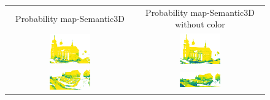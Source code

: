     \begin{figure}[h!]
        \centering
        \begin{tabular}{cc}
            Probability map-Semantic3D & Probability map-Semantic3D without color \\
            \includegraphics[width=0.33\textwidth, height=0.18\textheight]{images/ood_imgs/de_sem3d/de_prob_10_1.pdf}&
            \includegraphics[width=0.33\textwidth, height=0.18\textheight]{images/sem3d_of/de_prob_sem3d_of_1.pdf}\\

            \includegraphics[width=0.33\textwidth, height=0.18\textheight]{images/ood_imgs/de_sem3d/de_prob_10_2.pdf}&
            \includegraphics[width=0.33\textwidth, height=0.18\textheight]{images/sem3d_of/de_prob_sem3d_of_2.pdf}\\


\end{tabular}
\end{figure}
